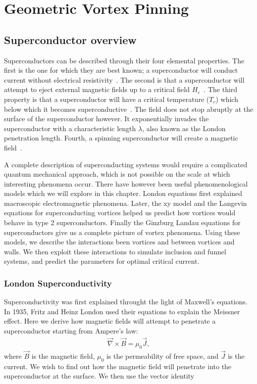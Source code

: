 \chapter{Geometric Vortex Pinning}
\label{theoryvortex}

\section{Superconductor overview}
Superconductors can be described through their four elemental properties. The first is the one for which they are best known; a superconductor will conduct current without electrical resistivity~\cite{Gallop90}. The second is that  a superconductor will attempt to eject external magnetic fields up to a critical field $H_c$~\cite{Landau84}. The third property is that a superconductor will have a critical temperature ($T_c$) which below which it becomes superconductive~\cite{Hove09}. The field does not stop abruptly at the surface of the superconductor however. It exponentially invades the superconductor with a characteristic length $\lambda$, also known as the London penetration length. Fourth, a spinning superconductor will create a magnetic field~\cite{Nasa}. 

	A complete description of superconducting systems would require a complicated quantum mechanical approach, which is not possible on the scale at which interesting phenomena occur. There have however been useful phenomenological models which we will explore in this chapter. London equations first explained macroscopic electromagnetic phenomena. Later, the xy model and the Langevin equations for superconducting vortices helped us predict how vortices would behave in type 2 superconductors. Finally the Ginzburg Landau equations for superconductors give us a complete picture of vortex phenomena. Using these models, we describe the interactions been vortices and between vortices and walls. We then exploit these interactions to simulate inclusion and funnel systems, and predict the parameters for optimal critical current. 
\subsection{London Superconductivity}
Superconductivity was first explained throught the light of Maxwell's equations. In 1935, Fritz and Heinz London used their equations to explain the Meissner effect. Here we derive how magnetic fields will attempt to penetrate a superconductor starting from Ampere's law:
\begin{eqnarray}
\overrightarrow \nabla \times \overrightarrow B  = \mu_0 \overrightarrow J,
\label{Ampere}
\end{eqnarray}
where $\overrightarrow B$ is the magnetic field, $\mu_0$ is the permeability of free space, and $\overrightarrow J$ is the current. We wish to find out how the magnetic field will penetrate into the superconductor at the surface. We then use the vector identity

